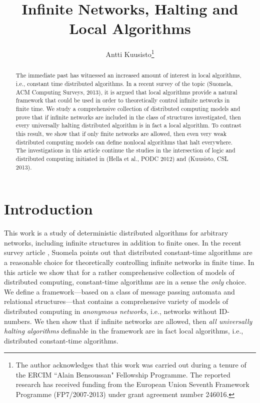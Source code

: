 \documentclass[copyright,creativecommons]{eptcs}
\title{Infinite Networks, Halting and Local Algorithms}
\author{Antti Kuusisto\thanks{The author acknowledges that
this work was carried out during a tenure of the
ERCIM ``Alain
Bensoussan" Fellowship Programme.
The reported research has received funding from the
European Union
Seventh Framework
Programme (FP7/2007-2013) under
grant agreement
number 246016.}
\institute{Institute of Computer Science\\ University of Wroc\l aw\\ Poland}
\email{antti.j.kuusisto@uta.fi}
}
\begin{document}
\maketitle

\begin{abstract}
The immediate past has witnessed an increased amount of interest in local algorithms, i.e., constant time distributed algorithms. In a recent survey of the topic (Suomela, ACM Computing Surveys, 2013), it is argued that local algorithms provide a natural framework that could be used in order to theoretically control infinite networks in finite time. We study a comprehensive collection of distributed computing models and prove that if infinite networks are included in the class of structures investigated, then every universally halting distributed algorithm is in fact a local algorithm. To contrast this result, we show that if only finite networks are allowed, then even very weak distributed computing models can define nonlocal algorithms that halt everywhere. The investigations in this article continue the studies in the intersection of logic and distributed computing initiated in (Hella et al., PODC 2012) and (Kuusisto, CSL 2013).




\end{abstract}

\section{Introduction}








This work is a study of deterministic distributed algorithms for arbitrary networks,
including infinite structures in addition to finite ones.
In the recent survey article \cite{suomela}, Suomela points out that distributed constant-time algorithms are a reasonable
choice for theoretically controlling infinite networks in finite time. In this article we show that for a rather comprehensive
collection of models of distributed computing, constant-time algorithms are in a
sense the \emph{only} choice. We define a
framework---based on a class of message passing automata and relational structures---that contains a
comprehensive variety of models of distributed computing in \emph{anonymous networks}, i.e., networks
without $\mathrm{ID}$-numbers.
We then show that if infinite networks are allowed,
then \emph{all universally halting algorithms} definable in the framework are in fact local algorithms, i.e.,
distributed constant-time algorithms. 
\end{document}
